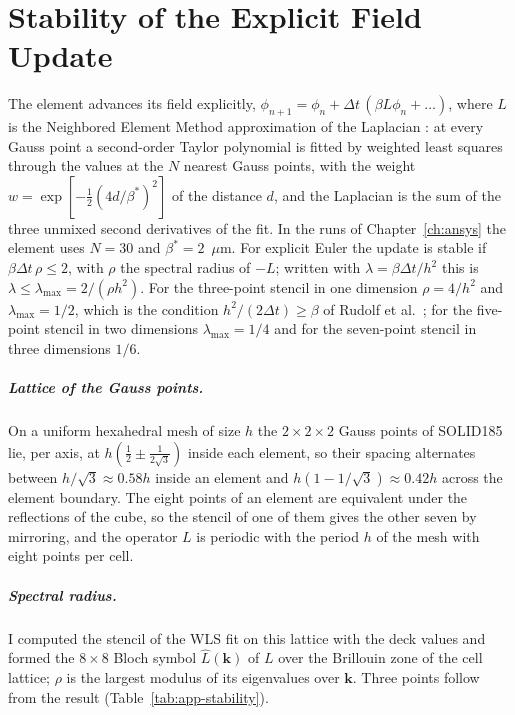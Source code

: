 \chapter{Stability of the Explicit Field Update}
\label{app:stability}


The element advances its field explicitly,
$\phi_{n+1}=\phi_n+\Delta t\,(\beta L\phi_n+\ldots)$, where $L$ is the
Neighbored Element Method approximation of the Laplacian
\cite{Blaszczyk2022TaylorWLS,Rudolf2025NEM}: at every Gauss point a
second-order Taylor polynomial is fitted by weighted least squares through
the values at the $N$ nearest Gauss points, with the weight
$w=\exp[-\tfrac12(4d/\beta^*)^2]$ of the distance $d$, and the Laplacian is
the sum of the three unmixed second derivatives of the fit. In the runs of
Chapter~\ref{ch:ansys} the element uses $N=30$ and $\beta^*=2$~$\mu$m. For
explicit Euler the update is stable if $\beta\Delta t\,\rho\le2$, with $\rho$
the spectral radius of $-L$; written with $\lambda=\beta\Delta t/h^2$ this is
$\lambda\le\lambda_{\max}=2/(\rho h^2)$. For the three-point stencil in one
dimension $\rho=4/h^2$ and $\lambda_{\max}=1/2$, which is the condition
$h^2/(2\Delta t)\ge\beta$ of Rudolf et al.~\cite{Rudolf2025NEM}; for the
five-point stencil in two dimensions $\lambda_{\max}=1/4$ and for the
seven-point stencil in three dimensions $1/6$.

\paragraph{Lattice of the Gauss points.} On a uniform hexahedral mesh
of size $h$ the $2\times2\times2$ Gauss points of SOLID185 lie, per
axis, at $h(\tfrac12\pm\tfrac{1}{2\sqrt3})$ inside each element, so their
spacing alternates between $h/\sqrt3\approx0.58h$ inside an element and
$h(1-1/\sqrt3)\approx0.42h$ across the element boundary. The eight points of
an element are equivalent under the reflections of the cube, so the stencil
of one of them gives the other seven by mirroring, and the operator $L$ is
periodic with the period $h$ of the mesh with eight points per cell.

\paragraph{Spectral radius.} I computed the stencil of the WLS fit on this
lattice with the deck values and formed the $8\times8$ Bloch symbol
$\hat L(\mathbf k)$ of $L$ over the Brillouin zone of the cell lattice; $\rho$
is the largest modulus of its eigenvalues over $\mathbf k$. Three points
follow from the result (Table~\ref{tab:app-stability}).


